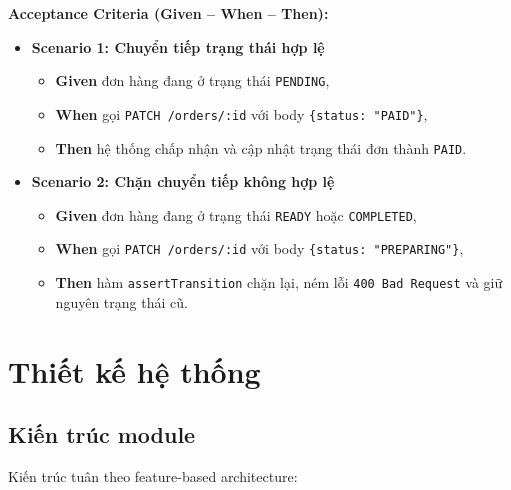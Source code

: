 \documentclass[12pt,a4paper]{article}
\begin{document}
\textbf{Acceptance Criteria (Given -- When -- Then):}
\begin{itemize}
  \item \textbf{Scenario 1: Chuyển tiếp trạng thái hợp lệ}
  \begin{itemize}
    \item \textbf{Given} đơn hàng đang ở trạng thái \texttt{PENDING},
    \item \textbf{When} gọi \texttt{PATCH /orders/:id} với body \texttt{\{status: "PAID"\}},
    \item \textbf{Then} hệ thống chấp nhận và cập nhật trạng thái đơn thành \texttt{PAID}.
  \end{itemize}
  \item \textbf{Scenario 2: Chặn chuyển tiếp không hợp lệ}
  \begin{itemize}
    \item \textbf{Given} đơn hàng đang ở trạng thái \texttt{READY} hoặc \texttt{COMPLETED},
    \item \textbf{When} gọi \texttt{PATCH /orders/:id} với body \texttt{\{status: "PREPARING"\}},
    \item \textbf{Then} hàm \texttt{assertTransition} chặn lại, ném lỗi \texttt{400 Bad Request} và giữ nguyên trạng thái cũ.
  \end{itemize}
\end{itemize}

\section{Thiết kế hệ thống}

\subsection{Kiến trúc module}

Kiến trúc tuân theo feature-based architecture:
\end{document}

